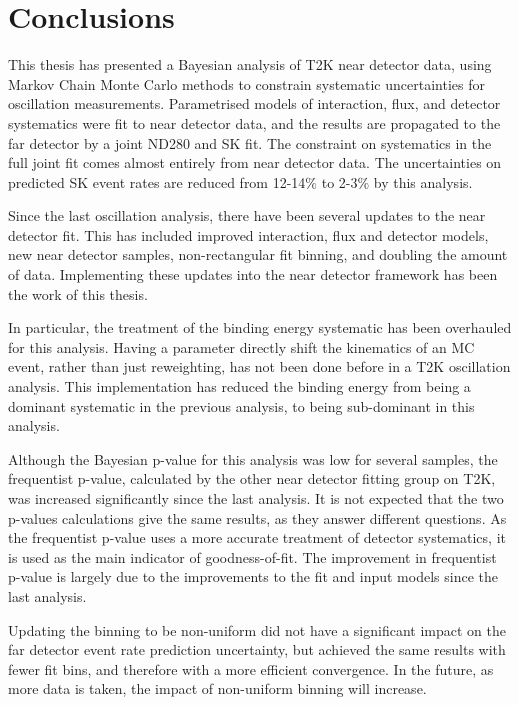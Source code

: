 \chapter{Conclusions}

This thesis has presented a Bayesian analysis of T2K near detector data, using Markov Chain Monte Carlo methods to constrain systematic uncertainties for oscillation measurements. Parametrised models of interaction, flux, and detector systematics were fit to near detector data, and the results are propagated to the far detector by a joint ND280 and SK fit. The constraint on systematics in the full joint fit comes almost entirely from near detector data. The uncertainties on predicted SK event rates are reduced from 12-14$\%$ to 2-3$\%$ by this analysis. 

Since the last oscillation analysis, there have been several updates to the near detector fit. This has included improved interaction, flux and detector models, new near detector samples, non-rectangular fit binning, and doubling the amount of data. Implementing these updates into the near detector framework has been the work of this thesis.

In particular, the treatment of the binding energy systematic has been overhauled for this analysis. Having a parameter directly shift the kinematics of an MC event, rather than just reweighting, has not been done before in a T2K oscillation analysis. This implementation has reduced the binding energy from being a dominant systematic in the previous analysis, to being sub-dominant in this analysis.

Although the Bayesian p-value for this analysis was low for several samples, the frequentist p-value, calculated by the other near detector fitting group on T2K, was increased significantly since the last analysis. It is not expected that the two p-values calculations give the same results, as they answer different questions. As the frequentist p-value uses a more accurate treatment of detector systematics, it is used as the main indicator of goodness-of-fit. The improvement in frequentist p-value is largely due to the improvements to the fit and input models since the last analysis.

Updating the binning to be non-uniform did not have a significant impact on the far detector event rate prediction uncertainty, but achieved the same results with fewer fit bins, and therefore with a more efficient convergence. In the future, as more data is taken, the impact of non-uniform binning will increase.

